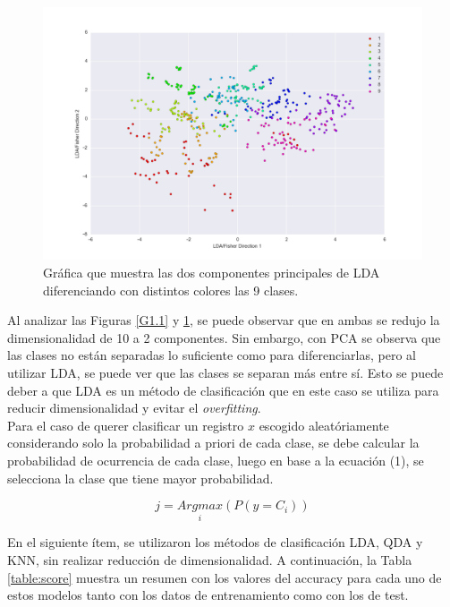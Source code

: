 \documentclass[letter, 10pt]{article}
\begin{document}
\begin{figure}[h]
\begin{center}
\includegraphics[width=1\textwidth]{Images/figure_2.png}
\caption{Gráfica que muestra las dos componentes principales de LDA diferenciando con distintos colores las 9 clases.}
\label{G1.2}
\end{center}
\end{figure}

Al analizar las Figuras \ref{G1.1} y \ref{G1.2}, se puede observar que en ambas se redujo la dimensionalidad de 10 a 2 componentes. Sin embargo, con PCA se observa que las clases no están separadas lo suficiente como para diferenciarlas, pero al utilizar LDA, se puede ver que las clases se separan más entre sí. Esto se puede deber a que LDA es un método de clasificación que en este caso se utiliza para reducir dimensionalidad y evitar el \textit{overfitting}.\\

Para el caso de querer clasificar un registro $x$ escogido aleatóriamente considerando solo la probabilidad a priori de cada clase, se debe calcular la probabilidad de ocurrencia de cada clase, luego en base a la ecuación (1), se selecciona la clase que tiene mayor probabilidad.

\begin{equation}
j=\underset{i}{Argmax} (P(y=C_i))
\end{equation}

En el siguiente ítem, se utilizaron los métodos de clasificación LDA, QDA y KNN, sin realizar reducción de dimensionalidad. A continuación, la Tabla \ref{table:score} muestra un resumen con los valores del accuracy para cada uno de estos modelos tanto con los datos de entrenamiento como con los de test.
\end{document}
